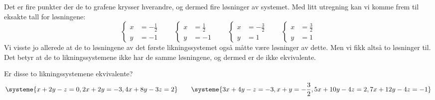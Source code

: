 \begin{losning}
Det er fire punkter der de to grafene krysser hverandre, og dermed
fire løsninger av systemet.  Med litt utregning kan vi komme frem til
eksakte tall for løsningene:
\[
\left\{
\begin{aligned}
x &= -\frac{1}{2} \\
y &= -1
\end{aligned}
\right.
\qquad
\left\{
\begin{aligned}
x &= \frac{1}{2} \\
y &= -1
\end{aligned}
\right.
\qquad
\left\{
\begin{aligned}
x &= -\frac{3}{2} \\
y &= 1
\end{aligned}
\right.
\qquad
\left\{
\begin{aligned}
x &= \frac{3}{2} \\
y &= 1
\end{aligned}
\right.
\]
Vi visste jo allerede at de to løsningene av det første
likningssystemet også måtte være løsninger av dette.  Men vi fikk
altså to løsninger til.  Det betyr at de to likningssystemene ikke har
de samme løsningene, og dermed er de ikke ekvivalente.
\end{losning}


\begin{oppgave}
Er disse to likningssystemene ekvivalente?
\[
\systeme{
  x + 2y - z = 0,
  2x + 2y = -3,
  4x + 8y - 3z = 2
}
\qquad
\systeme{
  3x + 4y - z = -3,
  x + y = -\frac{3}{2},
  5x + 10y - 4z = 2,
  7x + 12y - 4z = -1
}
\]
\end{oppgave}

